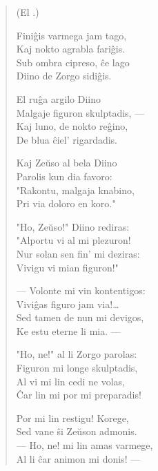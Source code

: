 \begin{verse}
\begin{center}
\footnotesize (El .)
\end{center}
                        Fini\^gis varmega jam tago,\\
                        Kaj nokto agrabla fari\^gis.\\
                        Sub ombra cipreso, \^ce lago\\
                        Diino de Zorgo sidi\^gis.

                        El ru\^ga argilo Diino\\
                        Malgaje figuron skulptadis, ---\\
                        Kaj luno, de nokto re\^gino,\\
                        De blua \^ciel' rigardadis.

                        Kaj Ze\u uso al bela Diino\\
                        Parolis kun dia favoro:\\
                        "Rakontu, malgaja knabino,\\
                        Pri via doloro en koro."

                        "Ho, Ze\u uso!" Diino rediras:\\
                        "Alportu vi al mi plezuron!\\
                        Nur solan sen fin' mi deziras:\\
                        Vivigu vi mian figuron!"

                        --- Volonte mi vin kontentigos:\\
                        Vivi\^gas figuro jam via!\dots\\
                        Sed tamen de nun mi devigos,\\
                        Ke estu eterne li mia. ---

                        "Ho, ne!" al li Zorgo parolas:\\
                        Figuron mi longe skulptadis,\\
                        Al vi mi lin cedi ne volas,\\
                        \^Car lin mi por mi preparadis!

                        Por mi lin restigu! Korege,\\
                        Sed vane \^si Ze\u uson admonis.\\
                        --- Ho, ne! mi lin amas varmege,\\
                        Al li \^car animon mi donis! ---


\end{verse}
